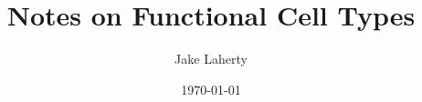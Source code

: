 \documentclass[11pt,a4paper]{article}
\title{Notes on Functional Cell Types}
\author{Jake Laherty}
\date{\today}
\begin{document}
\maketitle


\setcounter{section}{-1}







\printbibliography

\appendix
\renewcommand{\thesection}{A\arabic{section}}

\end{document}
